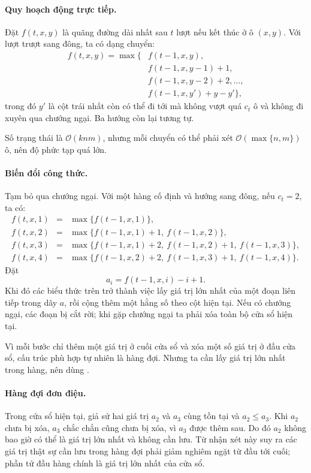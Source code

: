 \documentclass[11pt]{article}
\newcommand{\Oh}{\mathcal{O}}
\begin{document}
\paragraph{Quy hoạch động trực tiếp.}
Đặt \(f(t,x,y)\) là quãng đường dài nhất sau \(t\) lượt nếu kết thúc ở ô
\((x,y)\). Với lượt trượt sang đông, ta có dạng chuyển:
\[
\begin{aligned}
f(t,x,y)=\max\{&
f(t-1,x,y),\\
&f(t-1,x,y-1)+1,\\
&f(t-1,x,y-2)+2,\ldots,\\
&f(t-1,x,y')+y-y'\},
\end{aligned}
\]
trong đó \(y'\) là cột trái nhất còn có thể đi tới mà không vượt quá \(c_t\)
ô và không đi xuyên qua chướng ngại. Ba hướng còn lại tương tự.

Số trạng thái là \(\Oh(knm)\), nhưng mỗi chuyển có thể phải xét
\(\Oh(\max\{n,m\})\) ô, nên độ phức tạp quá lớn.

\paragraph{Biến đổi công thức.}
Tạm bỏ qua chướng ngại. Với một hàng cố định và hướng sang đông, nếu
\(c_t=2\), ta có:
\[
\begin{array}{rcl}
f(t,x,1)&=&\max\{f(t-1,x,1)\},\\
f(t,x,2)&=&\max\{f(t-1,x,1)+1,\ f(t-1,x,2)\},\\
f(t,x,3)&=&\max\{f(t-1,x,1)+2,\ f(t-1,x,2)+1,\ f(t-1,x,3)\},\\
f(t,x,4)&=&\max\{f(t-1,x,2)+2,\ f(t-1,x,3)+1,\ f(t-1,x,4)\}.
\end{array}
\]
Đặt
\[
  a_i=f(t-1,x,i)-i+1.
\]
Khi đó các biểu thức trên trở thành việc lấy giá trị lớn nhất của một đoạn
liên tiếp trong dãy \(a\), rồi cộng thêm một hằng số theo cột hiện tại. Nếu có
chướng ngại, các đoạn bị cắt rời; khi gặp chướng ngại ta phải xóa toàn bộ cửa
sổ hiện tại.

Vì mỗi bước chỉ thêm một giá trị ở cuối cửa sổ và xóa một số giá trị ở đầu
cửa sổ, cấu trúc phù hợp tự nhiên là hàng đợi. Nhưng ta cần lấy giá trị lớn
nhất trong hàng, nên dùng .

\paragraph{Hàng đợi đơn điệu.}
Trong cửa sổ hiện tại, giả sử hai giá trị \(a_2\) và \(a_3\) cùng tồn tại và
\(a_2\le a_3\). Khi \(a_2\) chưa bị xóa, \(a_3\) chắc chắn cũng chưa bị xóa,
vì \(a_3\) được thêm sau. Do đó \(a_2\) không bao giờ có thể là giá trị lớn
nhất và không cần lưu. Từ nhận xét này suy ra các giá trị thật sự cần lưu
trong hàng đợi phải giảm nghiêm ngặt từ đầu tới cuối; phần tử đầu hàng chính
là giá trị lớn nhất của cửa sổ.
\end{document}
